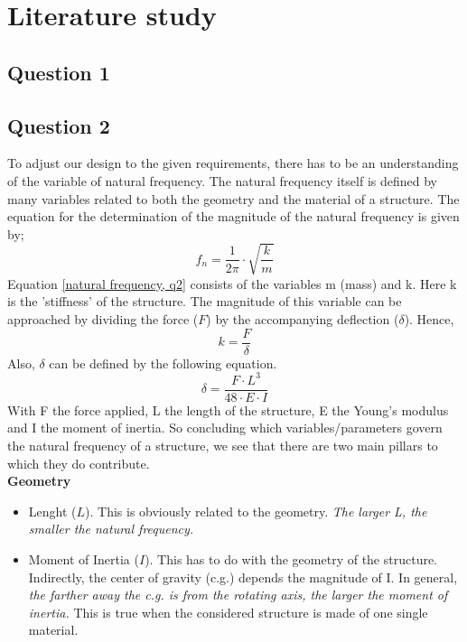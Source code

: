 
\chapter{Literature study}
\label{chapter:title}

\section{Question 1}

\section{Question 2}
To adjust our design to the given requirements, there has to be an understanding of the variable of natural frequency. The natural frequency itself is defined by many variables related to both the geometry and the material of a structure. The equation for the determination of the magnitude of the natural frequency is given by;
\begin{equation} \label{natural frequency, q2}
    f_n = \frac{1}{2\pi} \cdot \sqrt{\frac{k}{m}}
\end{equation}
Equation \eqref{natural frequency, q2} consists of the variables m (mass) and k. Here k is the 'stiffness' of the structure. The magnitude of this variable can be approached by dividing the force ($F$) by the accompanying deflection ($\delta$). Hence,
\begin{equation}
    k = \frac{F}{\delta}
\end{equation}
Also, $\delta$ can be defined by the following equation.
\begin{equation}
    \delta = \frac{F \cdot L^3}{48 \cdot E \cdot I}
\end{equation}
With F the force applied, L the length of the structure, E the Young's modulus and I the moment of inertia.
So concluding which variables/parameters govern the natural frequency of a structure, we see that there are two main pillars to which they do contribute. \\
\textbf{Geometry}
\begin{itemize}
    \item Lenght ($L$). This is obviously related to the geometry. \textit{The larger L, the smaller the natural frequency.}
    \item Moment of Inertia ($I$). This has to do with the geometry of the structure. Indirectly, the center of gravity (c.g.) depends the magnitude of I. In general, \textit{the farther away the c.g. is from the rotating axis, the larger the moment of inertia.} This is true when the considered structure is made of one single material.
\end{itemize}

